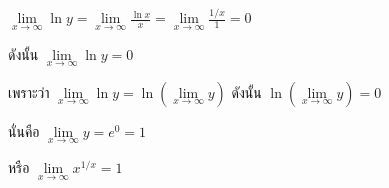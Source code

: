 \documentclass[
]{book}
\theoremstyle{definition}
\theoremstyle{definition}
\theoremstyle{definition}
\theoremstyle{definition}
\theoremstyle{remark}
\begin{document}
\(\displaystyle \mathop {\lim }\limits_{x\to \infty } \ln y=\mathop {\lim
}\limits_{x\to
\infty } \frac{\ln x}{x}=\mathop {\lim }\limits_{x\to \infty }
\frac{1/x}{1}=0\)

ดังนั้น \(\mathop {\lim }\limits_{x\to \infty } \ln y=0\)

เพราะว่า \(\mathop {\lim }\limits_{x\to \infty } \ln y=\ln (\mathop {\lim
}\limits_{x\to \infty } y)\) ดังนั้น \(\ln (\mathop {\lim }\limits_{x\to
\infty } y)=0\)

นั่นคือ \(\mathop {\lim }\limits_{x\to \infty } y=e^0=1\)

หรือ \(\mathop {\lim }\limits_{x\to \infty } x^{1/x}=1\)


  
\end{document}
